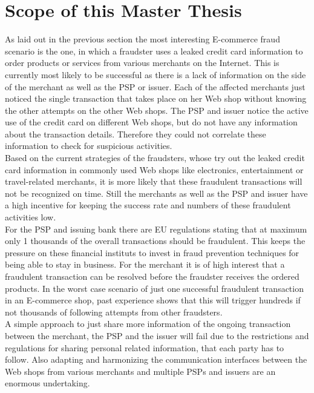 
\section{Scope of this Master Thesis}
\label{sec:scope_thesis}

As laid out in the previous section the most interesting E-commerce fraud scenario is the one, in which a fraudster uses a leaked credit card information to order products or services from various merchants on the Internet. This is currently most likely to be successful as there is a lack of information on the side of the merchant as well as the \gls{PSP} or issuer. Each of the affected merchants just noticed the single transaction that takes place on her Web shop without knowing the other attempts on the other Web shops. The \gls{PSP} and issuer notice the active use of the credit card on different Web shops, but do not have any information about the transaction details. Therefore they could not correlate these information to check for suspicious activities. \\

Based on the current strategies of the fraudsters, whose try out the leaked credit card information in commonly used Web shops like electronics, entertainment or travel-related merchants, it is more likely that these fraudulent transactions will not be recognized on time. Still the merchants as well as the \gls{PSP} and issuer have a high incentive for keeping the success rate and numbers of these fraudulent activities low. \\

For the \gls{PSP} and issuing bank there are EU regulations stating that at maximum only 1 thousands of the overall transactions should be fraudulent. This keeps the pressure on these financial instituts to invest in fraud prevention techniques for being able to stay in business. For the merchant it is of high interest that a fraudulent transaction can be resolved before the fraudster receives the ordered products. In the worst case scenario of just one successful fraudulent transaction in an E-commerce shop, past experience shows that this will trigger hundreds if not thousands of following attempts from other fraudsters. \\

A simple approach to just share more information of the ongoing transaction between the merchant, the \gls{PSP} and the issuer will fail due to the restrictions and regulations for sharing personal related information, that each party has to follow. Also adapting and harmonizing the communication interfaces between the Web shops from various merchants and multiple \gls{PSP}s and issuers are an enormous undertaking. \\

